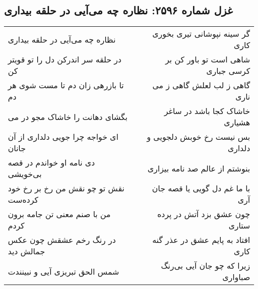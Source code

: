 \begin{center}
\section*{غزل شماره ۲۵۹۶: نظاره چه می‌آیی در حلقه بیداری}
\label{sec:2596}
\begin{longtable}{l p{0.5cm} r}
نظاره چه می‌آیی در حلقه بیداری
&&
گر سینه نپوشانی تیری بخوری کاری
\\
در حلقه سر اندرکن دل را تو قویتر کن
&&
شاهی است تو باور کن بر کرسی جباری
\\
تا بازرهی زان دم تا مست شوی هر دم
&&
گاهی ز لب لعلش گاهی ز می ناری
\\
بگشای دهانت را خاشاک مجو در می
&&
خاشاک کجا باشد در ساغر هشیاری
\\
ای خواجه چرا جویی دلداری از آن جانان
&&
بس نیست رخ خوبش دلجویی و دلداری
\\
دی نامه او خواندم در قصه بی‌خویشی
&&
بنوشتم از عالم صد نامه بیزاری
\\
نقش تو چو نقش من رخ بر رخ خود کرده‌ست
&&
با ما غم دل گویی یا قصه جان آری
\\
من با صنم معنی تن جامه برون کردم
&&
چون عشق بزد آتش در پرده ستاری
\\
در رنگ رخم عشقش چون عکس جمالش دید
&&
افتاد به پایم عشق در عذر گنه کاری
\\
شمس الحق تبریزی آیی و نبینندت
&&
زیرا که چو جان آیی بی‌رنگ صباواری
\\
\end{longtable}
\end{center}
